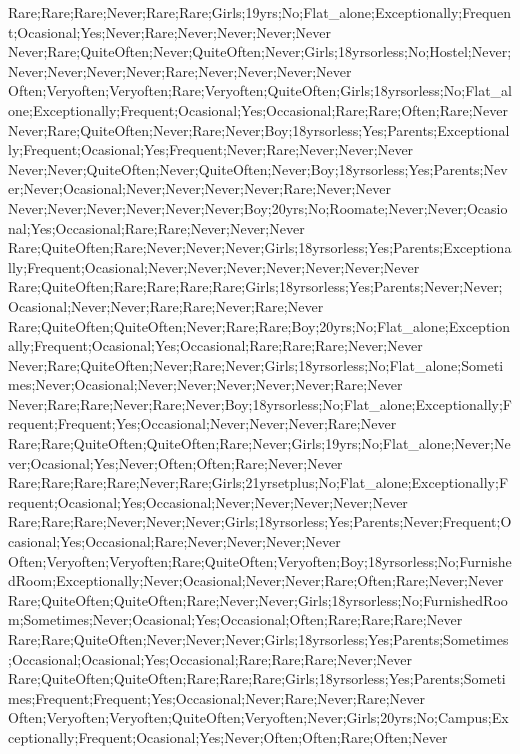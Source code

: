 Rare;Rare;Rare;Never;Rare;Rare;Girls;19yrs;No;Flat_alone;Exceptionally;Frequent;Ocasional;Yes;Never;Rare;Never;Never;Never;Never
Never;Rare;QuiteOften;Never;QuiteOften;Never;Girls;18yrsorless;No;Hostel;Never;Never;Never;Never;Never;Rare;Never;Never;Never;Never
Often;Veryoften;Veryoften;Rare;Veryoften;QuiteOften;Girls;18yrsorless;No;Flat_alone;Exceptionally;Frequent;Ocasional;Yes;Occasional;Rare;Rare;Often;Rare;Never
Never;Rare;QuiteOften;Never;Rare;Never;Boy;18yrsorless;Yes;Parents;Exceptionally;Frequent;Ocasional;Yes;Frequent;Never;Rare;Never;Never;Never
Never;Never;QuiteOften;Never;QuiteOften;Never;Boy;18yrsorless;Yes;Parents;Never;Never;Ocasional;Never;Never;Never;Never;Rare;Never;Never
Never;Never;Never;Never;Never;Never;Boy;20yrs;No;Roomate;Never;Never;Ocasional;Yes;Occasional;Rare;Rare;Never;Never;Never
Rare;QuiteOften;Rare;Never;Never;Never;Girls;18yrsorless;Yes;Parents;Exceptionally;Frequent;Ocasional;Never;Never;Never;Never;Never;Never;Never
Rare;QuiteOften;Rare;Rare;Rare;Rare;Girls;18yrsorless;Yes;Parents;Never;Never;Ocasional;Never;Never;Rare;Rare;Never;Rare;Never
Rare;QuiteOften;QuiteOften;Never;Rare;Rare;Boy;20yrs;No;Flat_alone;Exceptionally;Frequent;Ocasional;Yes;Occasional;Rare;Rare;Rare;Never;Never
Never;Rare;QuiteOften;Never;Rare;Never;Girls;18yrsorless;No;Flat_alone;Sometimes;Never;Ocasional;Never;Never;Never;Never;Never;Rare;Never
Never;Rare;Rare;Never;Rare;Never;Boy;18yrsorless;No;Flat_alone;Exceptionally;Frequent;Frequent;Yes;Occasional;Never;Never;Never;Rare;Never
Rare;Rare;QuiteOften;QuiteOften;Rare;Never;Girls;19yrs;No;Flat_alone;Never;Never;Ocasional;Yes;Never;Often;Often;Rare;Never;Never
Rare;Rare;Rare;Rare;Never;Rare;Girls;21yrsetplus;No;Flat_alone;Exceptionally;Frequent;Ocasional;Yes;Occasional;Never;Never;Never;Never;Never
Rare;Rare;Rare;Never;Never;Never;Girls;18yrsorless;Yes;Parents;Never;Frequent;Ocasional;Yes;Occasional;Rare;Never;Never;Never;Never
Often;Veryoften;Veryoften;Rare;QuiteOften;Veryoften;Boy;18yrsorless;No;FurnishedRoom;Exceptionally;Never;Ocasional;Never;Never;Rare;Often;Rare;Never;Never
Rare;QuiteOften;QuiteOften;Rare;Never;Never;Girls;18yrsorless;No;FurnishedRoom;Sometimes;Never;Ocasional;Yes;Occasional;Often;Rare;Rare;Rare;Never
Rare;Rare;QuiteOften;Never;Never;Never;Girls;18yrsorless;Yes;Parents;Sometimes;Occasional;Ocasional;Yes;Occasional;Rare;Rare;Rare;Never;Never
Rare;QuiteOften;QuiteOften;Rare;Rare;Rare;Girls;18yrsorless;Yes;Parents;Sometimes;Frequent;Frequent;Yes;Occasional;Never;Rare;Never;Rare;Never
Often;Veryoften;Veryoften;QuiteOften;Veryoften;Never;Girls;20yrs;No;Campus;Exceptionally;Frequent;Ocasional;Yes;Never;Often;Often;Rare;Often;Never
